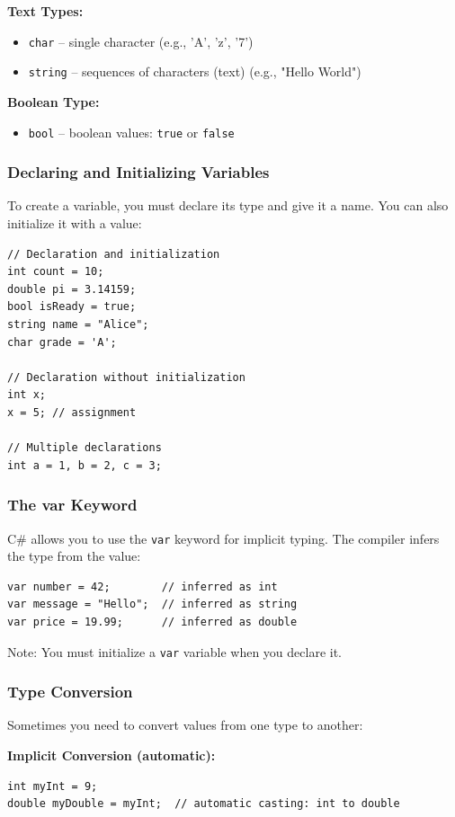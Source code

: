 \documentclass{article}
\begin{document}
\textbf{Text Types:}
\begin{itemize}
    \item \texttt{char} -- single character (e.g., 'A', 'z', '7')
    \item \texttt{string} -- sequences of characters (text) (e.g., "Hello World")
\end{itemize}

\textbf{Boolean Type:}
\begin{itemize}
    \item \texttt{bool} -- boolean values: \texttt{true} or \texttt{false}
\end{itemize}

\subsubsection{Declaring and Initializing Variables}
To create a variable, you must declare its type and give it a name. You can also initialize it with a value:

\begin{verbatim}
// Declaration and initialization
int count = 10;
double pi = 3.14159;
bool isReady = true;
string name = "Alice";
char grade = 'A';

// Declaration without initialization
int x;
x = 5; // assignment

// Multiple declarations
int a = 1, b = 2, c = 3;
\end{verbatim}

\subsubsection{The var Keyword}
C\# allows you to use the \texttt{var} keyword for implicit typing. The compiler infers the type from the value:

\begin{verbatim}
var number = 42;        // inferred as int
var message = "Hello";  // inferred as string
var price = 19.99;      // inferred as double
\end{verbatim}

Note: You must initialize a \texttt{var} variable when you declare it.

\subsubsection{Type Conversion}
Sometimes you need to convert values from one type to another:

\textbf{Implicit Conversion (automatic):}
\begin{verbatim}
int myInt = 9;
double myDouble = myInt;  // automatic casting: int to double
\end{verbatim}
\end{document}
